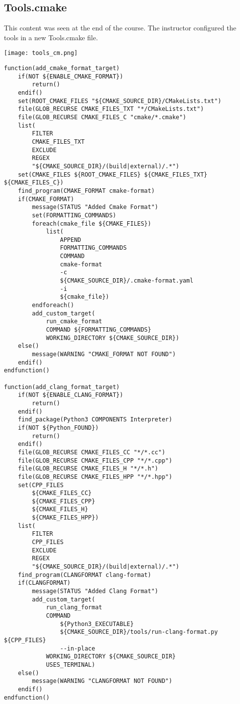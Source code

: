 \subsection{Tools.cmake}


This content was seen at the end of the course. The instructor configured the tools in a new Tools.cmake file.


\begin{center}
    \texttt{[image: tools\_cm.png]}
\end{center}


\begin{verbatim}
function(add_cmake_format_target)
    if(NOT ${ENABLE_CMAKE_FORMAT})
        return()
    endif()
    set(ROOT_CMAKE_FILES "${CMAKE_SOURCE_DIR}/CMakeLists.txt")
    file(GLOB_RECURSE CMAKE_FILES_TXT "*/CMakeLists.txt")
    file(GLOB_RECURSE CMAKE_FILES_C "cmake/*.cmake")
    list(
        FILTER
        CMAKE_FILES_TXT
        EXCLUDE
        REGEX
        "${CMAKE_SOURCE_DIR}/(build|external)/.*")
    set(CMAKE_FILES ${ROOT_CMAKE_FILES} ${CMAKE_FILES_TXT} ${CMAKE_FILES_C})
    find_program(CMAKE_FORMAT cmake-format)
    if(CMAKE_FORMAT)
        message(STATUS "Added Cmake Format")
        set(FORMATTING_COMMANDS)
        foreach(cmake_file ${CMAKE_FILES})
            list(
                APPEND
                FORMATTING_COMMANDS
                COMMAND
                cmake-format
                -c
                ${CMAKE_SOURCE_DIR}/.cmake-format.yaml
                -i
                ${cmake_file})
        endforeach()
        add_custom_target(
            run_cmake_format
            COMMAND ${FORMATTING_COMMANDS}
            WORKING_DIRECTORY ${CMAKE_SOURCE_DIR})
    else()
        message(WARNING "CMAKE_FORMAT NOT FOUND")
    endif()
endfunction()

function(add_clang_format_target)
    if(NOT ${ENABLE_CLANG_FORMAT})
        return()
    endif()
    find_package(Python3 COMPONENTS Interpreter)
    if(NOT ${Python_FOUND})
        return()
    endif()
    file(GLOB_RECURSE CMAKE_FILES_CC "*/*.cc")
    file(GLOB_RECURSE CMAKE_FILES_CPP "*/*.cpp")
    file(GLOB_RECURSE CMAKE_FILES_H "*/*.h")
    file(GLOB_RECURSE CMAKE_FILES_HPP "*/*.hpp")
    set(CPP_FILES
        ${CMAKE_FILES_CC}
        ${CMAKE_FILES_CPP}
        ${CMAKE_FILES_H}
        ${CMAKE_FILES_HPP})
    list(
        FILTER
        CPP_FILES
        EXCLUDE
        REGEX
        "${CMAKE_SOURCE_DIR}/(build|external)/.*")
    find_program(CLANGFORMAT clang-format)
    if(CLANGFORMAT)
        message(STATUS "Added Clang Format")
        add_custom_target(
            run_clang_format
            COMMAND
                ${Python3_EXECUTABLE}
                ${CMAKE_SOURCE_DIR}/tools/run-clang-format.py ${CPP_FILES}
                --in-place
            WORKING_DIRECTORY ${CMAKE_SOURCE_DIR}
            USES_TERMINAL)
    else()
        message(WARNING "CLANGFORMAT NOT FOUND")
    endif()
endfunction()


\end{verbatim}
